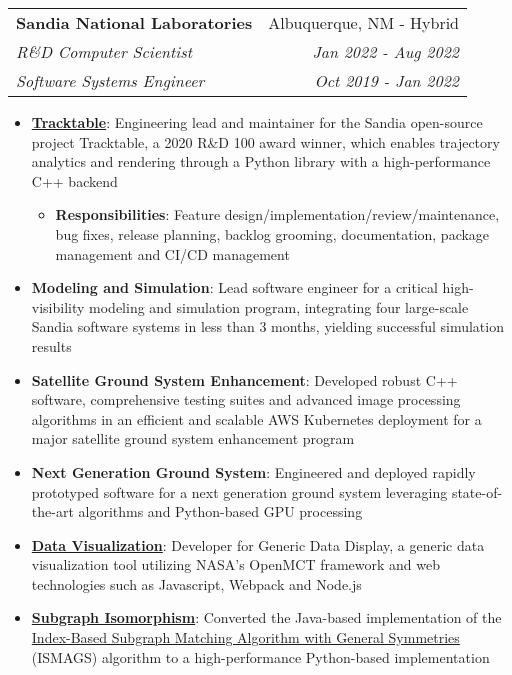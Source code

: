 \documentclass[letterpaper,10pt]{article}
\makeatletter
\newcommand{\resumeItem}[2]{
  \item\small{
    \textbf{#1}{: #2 \vspace{-2pt}}
  }
}
\newcommand{\resumeSubheadingPromo}[6]{
  \vspace{-1pt}\item
    \begin{tabular*}{0.97\textwidth}{l@{\extracolsep{\fill}}r}
      \textbf{#1} & #2 \\
      \textit{\small#3} & \textit{\small #4} \\
      \textit{\small#5} & \textit{\small #6} \\
    \end{tabular*}\vspace{-5pt}
}
\newcommand{\resumeItemListStart}{\begin{itemize}}
\newcommand{\resumeItemListEnd}{\end{itemize}\vspace{-1pt}}
\makeatother
\begin{document}
    \resumeSubheadingPromo
      {Sandia National Laboratories}{Albuquerque, NM - Hybrid}
      {R\&D Computer Scientist}{Jan 2022 - Aug 2022}
      {Software Systems Engineer}{Oct 2019 - Jan 2022}
      \resumeItemListStart
        \resumeItem{\href{https://tracktable.sandia.gov/}{Tracktable}}
          {Engineering lead and maintainer for the Sandia open-source project Tracktable, a 2020 R\&D 100 award winner, which enables trajectory analytics and rendering through a Python library with a high-performance C++ backend}
          \resumeItemListStart
            \resumeItem{Responsibilities}{Feature design/implementation/review/maintenance, bug fixes, release planning, backlog grooming, documentation, package management and CI/CD management}
          \resumeItemListEnd
        \resumeItem{Modeling and Simulation}
          {Lead software engineer for a critical high-visibility modeling and simulation program, integrating four large-scale Sandia software systems in less than 3 months, yielding successful simulation results}
        \resumeItem{Satellite Ground System Enhancement}
          {Developed robust C++ software, comprehensive testing suites and advanced image processing algorithms in an efficient and scalable AWS Kubernetes deployment for a major satellite ground system enhancement program}
        \resumeItem{Next Generation Ground System}
          {Engineered and deployed rapidly prototyped software for a next generation ground system leveraging state-of-the-art algorithms and Python-based GPU processing}
        \resumeItem{\href{https://github.com/sandialabs/generic-data-display}{Data Visualization}}
          {Developer for Generic Data Display, a generic data visualization tool utilizing NASA's OpenMCT framework and web technologies such as Javascript, Webpack and Node.js}
        \resumeItem{\href{https://github.com/sandialabs/ISMAGS-in-Python}{Subgraph Isomorphism}}
          {Converted the Java-based implementation of the \href{https://github.com/biointec/ismags}{Index-Based Subgraph Matching Algorithm with General Symmetries} (ISMAGS) algorithm to a high-performance Python-based implementation}
      \resumeItemListEnd
\end{document}
